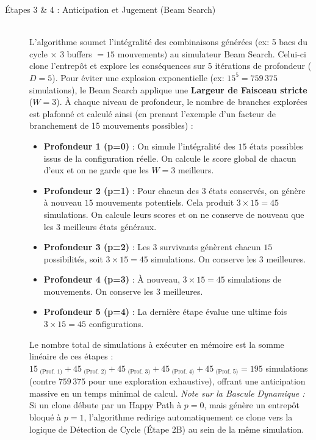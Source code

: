 \documentclass[11pt,a4paper]{article}
\begin{document}
\begin{description}
    \item[Étapes 3 \& 4 : Anticipation et Jugement (Beam Search)] \hfill \\
    L'algorithme soumet l'intégralité des combinaisons générées (ex: 5 bacs du cycle $\times$ 3 buffers $= 15$ mouvements) au simulateur Beam Search. Celui-ci clone l'entrepôt et explore les conséquences sur 5 itérations de profondeur ($D=5$).
    Pour éviter une explosion exponentielle (ex: $15^5 = 759\,375$ simulations), le Beam Search applique une \textbf{Largeur de Faisceau stricte} ($W=3$). À chaque niveau de profondeur, le nombre de branches explorées est plafonné et calculé ainsi (en prenant l'exemple d'un facteur de branchement de 15 mouvements possibles) :
    \begin{itemize}[noitemsep,topsep=4pt]
        \item \textbf{Profondeur 1 (p=0)} : On simule l'intégralité des $15$ états possibles issus de la configuration réelle. On calcule le score global de chacun d'eux et on ne garde que les $W = 3$ meilleurs.
        \item \textbf{Profondeur 2 (p=1)} : Pour chacun des $3$ états conservés, on génère à nouveau $15$ mouvements potentiels. Cela produit $3 \times 15 = 45$ simulations. On calcule leurs scores et on ne conserve de nouveau que les $3$ meilleurs états généraux.
        \item \textbf{Profondeur 3 (p=2)} : Les $3$ survivants génèrent chacun $15$ possibilités, soit $3 \times 15 = 45$ simulations. On conserve les $3$ meilleures.
        \item \textbf{Profondeur 4 (p=3)} : À nouveau, $3 \times 15 = 45$ simulations de mouvements. On conserve les $3$ meilleures.
        \item \textbf{Profondeur 5 (p=4)} : La dernière étape évalue une ultime fois $3 \times 15 = 45$ configurations.
    \end{itemize}
    Le nombre total de simulations à exécuter en mémoire est la somme linéaire de ces étapes : $15_{\text{ (Prof. 1)}} + 45_{\text{ (Prof. 2)}} + 45_{\text{ (Prof. 3)}} + 45_{\text{ (Prof. 4)}} + 45_{\text{ (Prof. 5)}} = 195$ simulations (contre $759\,375$ pour une exploration exhaustive), offrant une anticipation massive en un temps minimal de calcul.
    \emph{Note sur la Bascule Dynamique :} Si un clone débute par un Happy Path à $p=0$, mais génère un entrepôt bloqué à $p=1$, l'algorithme redirige automatiquement ce clone vers la logique de Détection de Cycle (Étape 2B) au sein de la même simulation.


\end{description}
\end{document}
